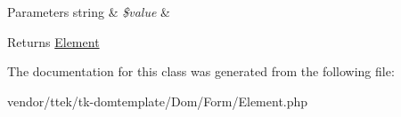 \begin{DoxyParams}[1]{Parameters}
string & {\em \$value} & \\
\hline
\end{DoxyParams}
\begin{DoxyReturn}{Returns}
\hyperlink{classDom_1_1Form_1_1Element}{Element} 
\end{DoxyReturn}


The documentation for this class was generated from the following file\+:\begin{DoxyCompactItemize}
\item 
vendor/ttek/tk-\/domtemplate/\+Dom/\+Form/Element.\+php\end{DoxyCompactItemize}
